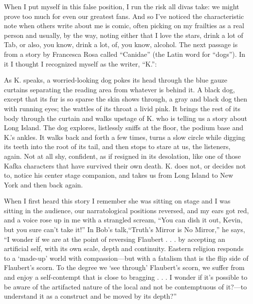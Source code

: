 \documentclass[
]{memoir}
\begin{document}
When I put myself in this false position, I run the risk all divas take:
we might prove too much for even our greatest fans. And so I've noticed
the characteristic note when others write about me is comic, often
picking on my frailties as a real person and usually, by the way, noting
either that I love the stars, drink a lot of Tab, or also, you know,
drink a lot, of, you know, alcohol. The next passage is from a story by
Francesca Rosa called ``Canidae'' (the Latin word for ``dogs''). In it I
thought I recognized myself as the writer, ``K.'':

As K. speaks, a worried-looking dog pokes its head through the blue
gauze curtains separating the reading area from whatever is behind it. A
black dog, except that its fur is so sparse the skin shows through, a
gray and black dog then with running eyes; the wattles of its throat a
livid pink. It brings the rest of its body through the curtain and walks
upstage of K. who is telling us a story about Long Island. The dog
explores, listlessly sniffs at the floor, the podium base and K.'s
ankles. It walks back and forth a few times, turns a slow circle while
digging its teeth into the root of its tail, and then stops to stare at
us, the listeners, again. Not at all shy, confident, as if resigned in
its desolation, like one of those Kafka characters that have survived
their own death. K. does not, or decides not to, notice his center stage
companion, and takes us from Long Island to New York and then back
again.

When I first heard this story I remember she was sitting on stage and I
was sitting in the audience, our narratological positions reversed, and
my ears got red, and a voice rose up in me with a strangled scream,
``You can dish it out, Kevin, but you sure can't take it!'' In Bob's
talk,``Truth's Mirror is No Mirror,'' he says, ``I wonder if we are at
the point of reversing Flaubert . . . by accepting an artificial self,
with its own scale, depth and continuity. Eastern religion responds to a
`made-up' world with compassion---but with a fatalism that is the flip
side of Flaubert's scorn. To the degree we `see through' Flaubert's
scorn, we suffer from and enjoy a self-contempt that is close to
bragging . . . I wonder if it's possible to be aware of the artifacted
nature of the local and not be contemptuous of it?---to understand it as
a construct and be moved by its depth?''
\end{document}
